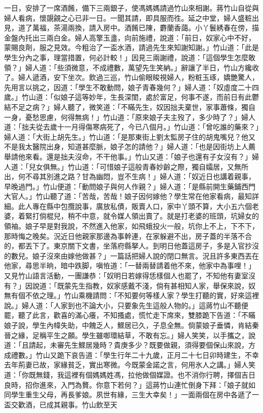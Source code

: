一日，安排了一席酒餚，備下三兩銀子，使馮媽媽請過竹山來相謝。蔣竹山自從與婦人看病，懷覬覦之心已非一日。一聞其請，即具服而徃。延之中堂，婦人盛粧出見，道了萬福，茶湯兩換，請入房中。酒餚已陳，麝蘭香藹。小丫鬟綉春在傍，描金盤內托出三兩白金。婦人高擎玉盞，向前施禮，說道：「前日，奴家心中不好，蒙賜良劑，服之見效。今粗治了一盃水酒，請過先生來知謝知謝。」竹山道：「此是學生分內之事，理當措置，何必計較！」因見三兩謝禮，說道：「這個學生怎麼敢領？」婦人道：「些須微意，不成禮數，萬望先生笑納。」辭讓了半日，竹山方纔收了。婦人遞酒，安下坐次。飲過三巡，竹山偷眼睃視婦人，粉粧玉琢，嬌艷驚人，先用言以挑之，因道：「學生不敢動問，娘子青春幾何？」婦人道：「奴虛度二十四歲。」竹山道：「似娘子這等妙年，生長深閨，處於富足，何事不遂，而前日有此鬱結不足之病？」{}婦人聽了，微笑道：「不瞞先生，奴因拙夫棄世，家事蕭條，獨自一身，{}憂愁思慮，何得無病！」竹山道：「原來娘子夫主歿了，多少時了？」婦人道：「拙夫從去歲十一月得傷寒病死了，今已八個月。」竹山道：「曾吃誰的藥來？」{}婦人道：「大街上胡先生。」竹山道：「是那東街上劉太監房子住的胡鬼嘴兒？他又不是我太醫院出身，知道甚麼脈，娘子怎的請他？」婦人道：「也是因街坊上人薦舉請他來看。還是拙夫沒命，不干他事。」竹山又道：「娘子也還有子女沒有？」婦人道：「兒女俱無。」竹山道：「可惜娘子這般青春妙齡之際，獨自孀居，又無所出，何不尋其別進之路？甘為幽悶，豈不生病！」{}婦人道：「奴近日也講着親事，早晚過門。」竹山便道：「動問娘子與何人作親？」婦人道：「是縣前開生藥鋪西門大官人。」竹山聽了道：「苦哉，苦哉！娘子因何嫁他？學生常在他家看病，最知詳細。此人專在縣中包攬說事，廣放私債，販賣人口，家中丫頭不算，大小五六個老婆，着緊打倘棍兒，稍不中意，就令媒人領出賣了。就是打老婆的班頭，坑婦女的領袖。娘子早是對我說，不然進入他家，如飛蛾投火一般，坑你上不上，下不下，那時悔之晚矣。況近日他親家那邊為事幹連，在家躲避不出，房子蓋的半落不合的，都丟下了。東京關下文書，坐落府縣拏人。到明日他蓋這房子，多是入官抄沒的數兒。娘子沒來由嫁他做甚？」一篇話把婦人說的閉口無言。況且許多東西丟在他家，尋思半晌，暗中跌脚，{}嗔恠道：「一替兩替請着他不來，他家中為事哩！」又見竹山語言活動，一團謙恭：「奴明日若嫁得恁樣個人也罷了，{}不知他有妻室沒有？」因說道：「既蒙先生指教，奴家感戴不淺，倘有甚相知人家，舉保來說，奴無有個不依之理。」竹山乘機請問：「不知要何等樣人家？學生打聽的實，好來這裡說。」婦人道：「人家到也不論大小，只要象先生這般人物的。」這蔣竹山不聽便罷，聽了此言，歡喜的滿心癢，不知搔處，慌忙走下席來，雙膝跪下告道：「不瞞娘子說，學生內幃失助，中餽乏人，鰥居已久，子息全無。倘蒙娘子垂憐，肯結秦晉之緣，足稱平生之願。學生雖啣環結草，不敢有忘。」{}婦人笑笑，以手攜之，說道：「且請起，未審先生鰥居幾時？貴庚多少？既要做親，須得要個保山來說，方成禮數。」竹山又跪下哀告道：「學生行年二十九歲，正月二十七日卯時建生，不幸去年荊妻已故，家緣貧乏，實出寒微。今既蒙金諾之言，何用氷人之講。」婦人笑道：「你既無錢，我這裡有個媽媽姓馮，拉他做個媒證。也不消你行聘，擇個吉日良時，招你進來，入門為贅。你意下若何？」這蔣竹山連忙倒身下拜：「娘子就如同學生重生父母，再長爹娘。夙世有緣，三生大幸矣！」一面兩個在房中各遞了一盃交歡酒，已成其親事。竹山飲至天
